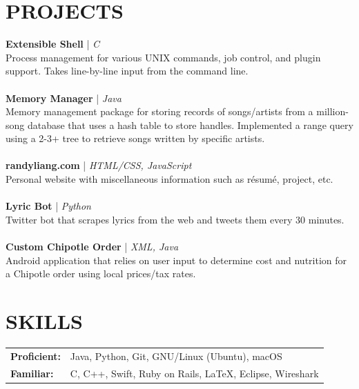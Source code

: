 \documentclass[line,margin]{res}
\begin{document}
\begin{resume}
	\section{PROJECTS}
	\textbf{Extensible Shell} | {\sl C}\\ Process management for various UNIX commands, job control, and plugin support. Takes line-by-line input from the command line.\\\\
	\textbf{Memory Manager} | {\sl Java}\\ 
	Memory management package for storing records of songs/artists from a million-song database that uses a hash table to store handles. Implemented a range query using a 2-3+ tree to retrieve songs written by specific artists.\\\\
	\textbf{randyliang.com} | {\sl HTML/CSS, JavaScript}\\ Personal website with miscellaneous information such as r\'esum\'e, project, etc.\\\\
	\textbf{Lyric Bot} | {\sl Python}\\ Twitter bot that scrapes lyrics from the web and tweets them every 30 minutes.\\\\
	\textbf{Custom Chipotle Order} | {\sl XML, Java}\\ Android application that relies on user input to determine cost and nutrition for a Chipotle order using local prices/tax rates.
	\section{SKILLS}
	\begin{tabular}{@{}ll}
		\textbf{Proficient:} & Java, Python, Git, GNU/Linux (Ubuntu), macOS \\
		\textbf{Familiar:} & C, C++, Swift, Ruby on Rails, \LaTeX, Eclipse, Wireshark \\		
	\end{tabular} 
	\vspace{10mm}
\end{resume}
\end{document}
